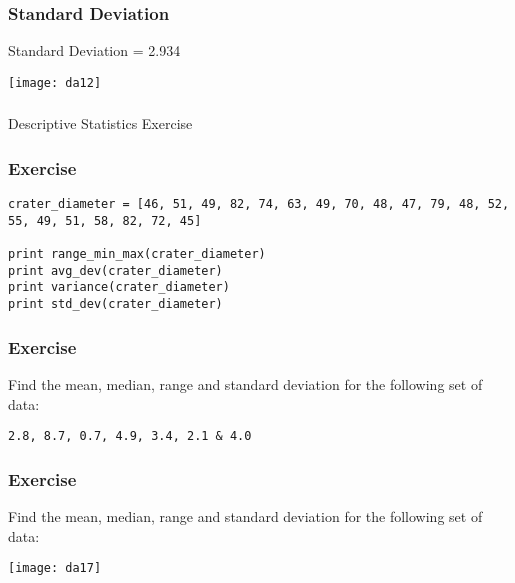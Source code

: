 
\begin{frame}[fragile]\frametitle{Standard Deviation}	
Standard Deviation = 2.934
\begin{center}
\texttt{[image: da12]}
\end{center}
\end{frame}

\begin{frame}[fragile]\frametitle{}
\begin{center}
{\Large Descriptive Statistics Exercise}
\end{center}
\end{frame}

\begin{frame}[fragile]\frametitle{Exercise}	
\begin{lstlisting}
crater_diameter = [46, 51, 49, 82, 74, 63, 49, 70, 48, 47, 79, 48, 52, 55, 49, 51, 58, 82, 72, 45]
 
print range_min_max(crater_diameter)
print avg_dev(crater_diameter)
print variance(crater_diameter)
print std_dev(crater_diameter)
\end{lstlisting}
\end{frame}


\begin{frame}[fragile]\frametitle{Exercise}	
Find the mean, median, range and standard deviation for the following set of data:

\lstinline|2.8, 8.7, 0.7, 4.9, 3.4, 2.1 & 4.0|
\end{frame}

\begin{frame}[fragile]\frametitle{Exercise}	
Find the mean, median, range and standard deviation for the following set of data:

\begin{center}
\texttt{[image: da17]}
\end{center}
\end{frame}

